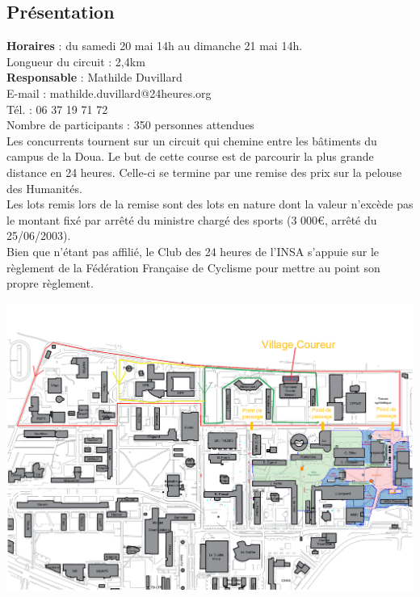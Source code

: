 \documentclass[hidelinks, paper=a4, fontsize=13pt]{report}
\begin{document}
\subsection{Présentation}

\textbf{Horaires} : du samedi 20 mai 14h au dimanche 21 mai 14h.\\

Longueur du circuit : 2,4km \\

\textbf{Responsable} : Mathilde Duvillard\\
	E-mail : mathilde.duvillard@24heures.org\\
	Tél. : 06 37 19 71 72\\

Nombre de participants : 350 personnes attendues\\

Les concurrents tournent sur un circuit qui chemine entre les bâtiments du campus de la Doua. Le but de cette course est de parcourir la plus grande distance en 24 heures. Celle-ci se termine par une remise des prix sur la pelouse des Humanités.\\
Les lots remis lors de la remise sont des lots en nature dont la valeur n'excède pas le montant fixé par arrêté du ministre chargé des sports (3 000\euro{}, arrêté du 25/06/2003).\\
Bien que n’étant pas affilié, le Club des 24 heures de l'INSA s’appuie sur le règlement de la Fédération Française de Cyclisme pour mettre au point son propre règlement.

\begin{center}
\includegraphics[width=\textwidth,keepaspectratio,angle=90]{Exports/Plan_24h_44eme-Parcours_courses}
\end{center}
\end{document}
